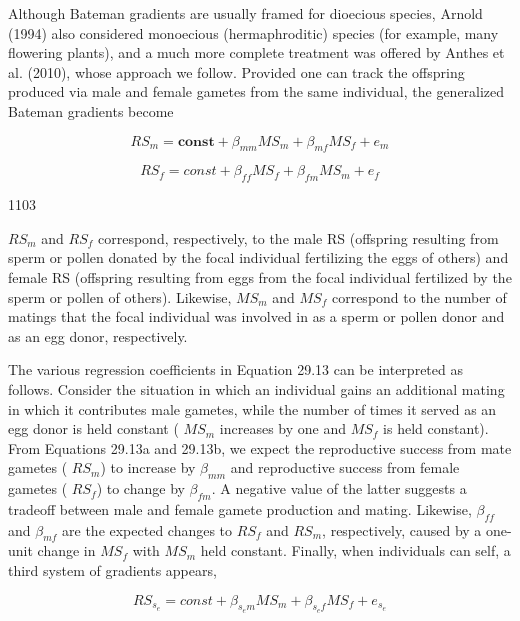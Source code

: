 \documentclass{article}
\begin{document}
Although Bateman gradients are usually framed for dioecious species, Arnold (1994) also considered monoecious (hermaphroditic) species (for example, many flowering plants), and a much more complete treatment was offered by Anthes et al. (2010), whose approach we follow. Provided one can track the offspring produced via male and female gametes from the same individual, the generalized Bateman gradients become

\begin{equation}
RS_{m}=\mathbf{const}+\beta_{mm}MS_{m}+\beta_{mf}MS_{f}+e_{m}
\tag{29.13a}
\label{eq:29_13a}
\end{equation}

\begin{equation}
RS_{f}=const+\beta_{ff}MS_{f}+\beta_{fm}MS_{m}+e_{f}
\tag{29.13b}
\label{eq:29_13b}
\end{equation}

1103

 $ RS_{m} $ and  $ RS_{f} $ correspond, respectively, to the male RS (offspring resulting from sperm or pollen donated by the focal individual fertilizing the eggs of others) and female RS (offspring resulting from eggs from the focal individual fertilized by the sperm or pollen of others). Likewise,  $ MS_{m} $ and  $ MS_{f} $ correspond to the number of matings that the focal individual was involved in as a sperm or pollen donor and as an egg donor, respectively.

The various regression coefficients in Equation 29.13 can be interpreted as follows. Consider the situation in which an individual gains an additional mating in which it contributes male gametes, while the number of times it served as an egg donor is held constant ( $ MS_m $ increases by one and  $ MS_f $ is held constant). From Equations 29.13a and 29.13b, we expect the reproductive success from mate gametes ( $ RS_m $) to increase by  $ \beta_{mm} $ and reproductive success from female gametes ( $ RS_f $) to change by  $ \beta_{fm} $. A negative value of the latter suggests a tradeoff between male and female gamete production and mating. Likewise,  $ \beta_{ff} $ and  $ \beta_{mf} $ are the expected changes to  $ RS_f $ and  $ RS_m $, respectively, caused by a one-unit change in  $ MS_f $ with  $ MS_m $ held constant. Finally, when individuals can self, a third system of gradients appears,

\begin{equation}
RS_{s_{e}}=const+\beta_{s_{e}m}MS_{m}+\beta_{s_{e}f}MS_{f}+e_{s_{e}}
\tag{29.13c}
\label{eq:29_13c}
\end{equation}
\end{document}
